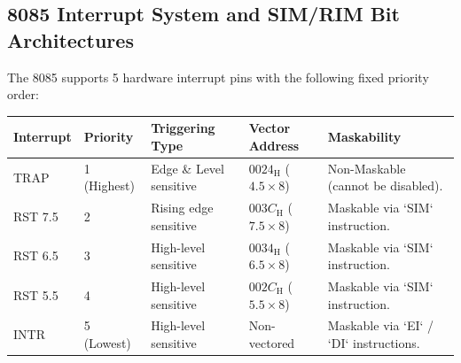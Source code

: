 \documentclass[12pt,a4paper]{article}
\begin{document}
\subsection{8085 Interrupt System and SIM/RIM Bit Architectures}
The 8085 supports 5 hardware interrupt pins with the following fixed priority order:
\par\vspace{6pt}\noindent
\begingroup
\setlength{\extrarowheight}{2.5pt}
\noindent\begin{tabularx}{\linewidth}{|B{2.2cm}|B{2.0cm}|B{2.6cm}|B{2.4cm}|Y|}
\hline
\textbf{Interrupt} & \textbf{Priority} & \textbf{Triggering Type} & \textbf{Vector Address} & \textbf{Maskability} \\ \hline
TRAP & 1 (Highest) & Edge \& Level sensitive & $0024_{\mathrm{H}}$ ($4.5 \times 8$) & Non-Maskable (cannot be disabled). \\ \hline
RST 7.5 & 2 & Rising edge sensitive & $003C_{\mathrm{H}}$ ($7.5 \times 8$) & Maskable via `SIM` instruction. \\ \hline
RST 6.5 & 3 & High-level sensitive & $0034_{\mathrm{H}}$ ($6.5 \times 8$) & Maskable via `SIM` instruction. \\ \hline
RST 5.5 & 4 & High-level sensitive & $002C_{\mathrm{H}}$ ($5.5 \times 8$) & Maskable via `SIM` instruction. \\ \hline
INTR & 5 (Lowest) & High-level sensitive & Non-vectored & Maskable via `EI` / `DI` instructions. \\ \hline
\end{tabularx}\par
\endgroup
\end{document}
